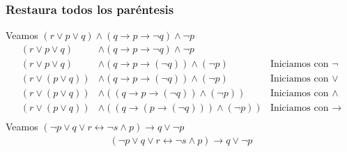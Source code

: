\documentclass[a4paper]{article}
\begin{document}
    \subsubsection{Restaura todos los paréntesis}
    Veamos \(\left(r \lor p \lor q\right) \land \left(q \rightarrow p \rightarrow \neg q\right) \land \neg p\)
    \begin{align*}
        \left(r \lor p \lor q\right) &\land \left(q \rightarrow p \rightarrow \neg q\right) \land \neg p & \text{} \\
        \left(r \lor p \lor q\right) &\land \left(q \rightarrow p \rightarrow \left(\neg q\right)\right) \land \left(\neg p\right) & \text{Iniciamos con \(\neg\)} \\
        \left(r \lor \left(p \lor q\right)\right) &\land \left(q \rightarrow p \rightarrow \left(\neg q\right)\right) \land \left(\neg p\right) & \text{Iniciamos con \(\lor\)} \\
        \left(r \lor \left(p \lor q\right)\right) &\land \left(\left(q \rightarrow p \rightarrow \left(\neg q\right)\right) \land \left(\neg p\right)\right) & \text{Iniciamos con \(\land\)} \\
        \left(r \lor \left(p \lor q\right)\right) &\land \left(\left(q \rightarrow \left(p \rightarrow \left(\neg q\right)\right)\right) \land \left(\neg p\right)\right) & \text{Iniciamos con \(\rightarrow\)} \\
    \end{align*}
    Veamos \(\left(\neg p \lor q \lor r \leftrightarrow \neg s \land p\right) \rightarrow q \lor \neg p\)
    \begin{align*}
        \left(\neg p \lor q \lor r \leftrightarrow \neg s \land p\right) \rightarrow q \lor \neg p 
    \end{align*}
\end{document}
